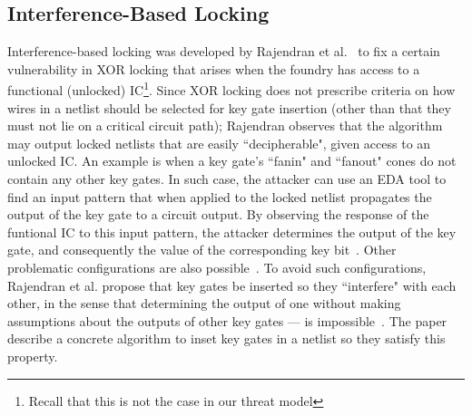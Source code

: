 

\subsection{Interference-Based Locking~\cite{rajendran2012logic}}
Interference-based locking was developed by Rajendran et al.~\cite{rajendran2012logic} to fix a certain vulnerability in XOR locking that arises when the foundry has access to a functional (unlocked) IC\footnote{Recall that this is not the case in our threat model}. Since XOR locking does not prescribe criteria on how wires in a netlist should be selected for key gate insertion (other than that they must not lie on a critical circuit path); Rajendran observes that the algorithm may output locked netlists that are easily ``decipherable", given access to an unlocked IC. An example is when a key gate's ``fanin" and ``fanout" cones do not contain any other key gates. In such case, the attacker can use an EDA tool to find an input pattern that when applied to the locked netlist propagates the output of the key gate to a circuit output. By observing the response of the funtional IC to this input pattern, the attacker determines the output of the key gate, and consequently the value of the corresponding key bit~\cite{rajendran2012security}. Other problematic configurations are also possible~\cite{rajendran2012logic}. To avoid such configurations, Rajendran et al. propose that key gates be inserted so they ``interfere" with each other, in the sense that determining the output of one without making assumptions about the outputs of other key gates --- is impossible~\cite{rajendran2012logic}. The paper describe a concrete algorithm to inset key gates in a netlist so they satisfy this property.

